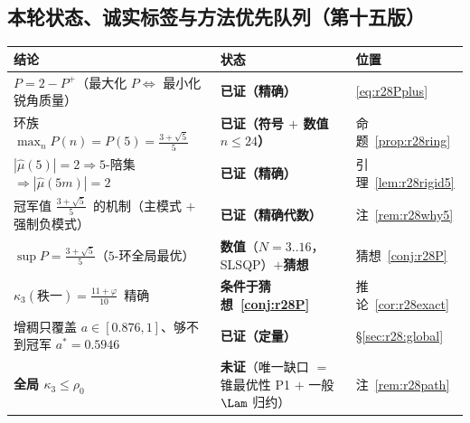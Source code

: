 \subsection{本轮状态、诚实标签与方法优先队列（第十五版）}\label{sec:r28:status}

\begin{center}\small
\begin{tabular}{lll}
\toprule
结论 & 状态 & 位置\\
\midrule
$P=2-P^+$（最大化 $P\iff$ 最小化锐角质量） & \textbf{已证（精确）} & \eqref{eq:r28Pplus}\\
环族 $\max_nP(n)=P(5)=\frac{3+\sqrt5}5$ & \textbf{已证（符号 $+$ 数值 $n\le24$）} & 命题~\ref{prop:r28ring}\\
$|\widehat\mu(5)|=2\Rightarrow5$-陪集 $\Rightarrow|\widehat\mu(5m)|=2$ & \textbf{已证（精确）} & 引理~\ref{lem:r28rigid5}\\
冠军值 $\frac{3+\sqrt5}5$~的机制（主模式 $+$ 强制负模式） & \textbf{已证（精确代数）} & 注~\ref{rem:r28why5}\\
$\sup P=\frac{3+\sqrt5}5$（$5$-环全局最优） & \textbf{数值}（$N=3..16$，SLSQP）$+$\textbf{猜想} & 猜想~\ref{conj:r28P}\\
$\kappa_3(\text{秩一})=\frac{11+\varphi}{10}$~精确 & \textbf{条件于猜想~\ref{conj:r28P}} & 推论~\ref{cor:r28exact}\\
增稠只覆盖 $a\in[0.876,1]$、够不到冠军 $a^*=0.5946$ & \textbf{已证（定量）} & \S\ref{sec:r28:global}\\
\textbf{全局 $\kappa_3\le\rho_0$} & \textbf{未证}（唯一缺口 $=$ 锥最优性 P1 $+$ 一般 $\Lam$ 归约） & 注~\ref{rem:r28path}\\
\bottomrule
\end{tabular}
\end{center}

